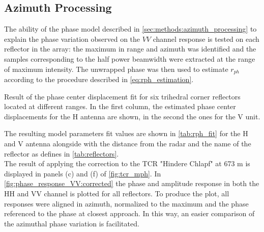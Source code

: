 \subsection{Azimuth Processing}\label{sec:results:azimuth_processing}
The ability of the phase model described in \autoref{sec:methods:azimuth_processing} to explain the phase variation observed on the $VV$ channel response is tested on each reflector in the array: the maximum in range and azimuth was identified and the samples corresponding to the half power beamwidth were extracted at the range of maximum intensity. The unwrapped phase was then used to estimate $r_{ph}$ according to the procedure described in \autoref{eq:rph_estimation}.

\begin{table}[ht]
	\centering
	\caption{Result of the phase center displacement fit for six trihedral corner reflectors located at different ranges. In the first column, the estimated phase center displacements for the H antenna are shown, in the second the ones for the V unit.}
	\label{tab:rph_fit}
\end{table}
The resulting model parameters fit values  are shown in \autoref{tab:rph_fit} for the H and V antenna alongside with the distance from the radar and the name of the reflector as defines in \autoref{tab:reflectors}.\\
The result of applying the correction to the TCR "Hindere Chlapf" at 673 m is displayed in panels (c) and (f) of \autoref{fig:tcr_mph}.
In \autoref{fig:phase_response_VV:corrected} the phase and amplitude response in both the HH and VV channel is plotted for all reflectors. To produce the plot, all responses were aligned in azimuth, normalized to the maximum and the phase referenced to the phase at closest approach. In this way, an easier comparison of the azimuthal phase variation is facilitated.

